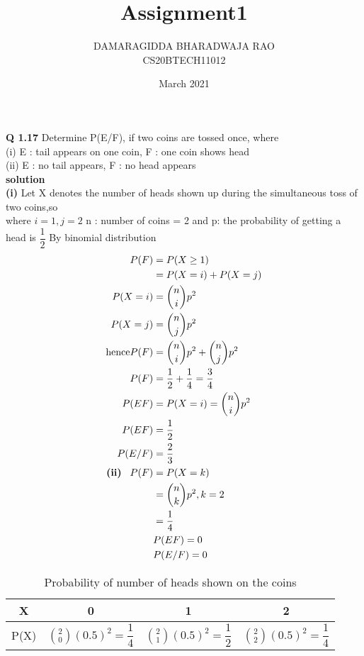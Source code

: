\documentclass[11pt,a4paper,twocolumn]{article}
\title{Assignment1}
\author{DAMARAGIDDA BHARADWAJA RAO\\CS20BTECH11012}
\date{March 2021}
\begin{document}
\maketitle
\noindent
\textbf{Q 1.17} Determine P(E/F), if two coins are tossed
once, where\\
(i) E : tail appears on one coin, F : one coin
shows head\\
\vspace{0.5cm}
(ii) E : no tail appears, F : no head appears\\
\textbf{solution}\\

\textbf{(i)} Let X denotes the number of heads shown up during the simultaneous toss of two coins,so \\
where $ i = 1,j = 2 $  n : number of coins = 2 and p: the probability of getting a head is $\dfrac{1}{2}$
By binomial distribution
\begin{align*}
P(F)&=P(X\geq 1)\\
&=P(X=i)+P(X=j)\\
P(X=i)&=\binom{n}{i} p ^2\\
P(X=j)&=\binom{n}{j} p ^2\\
\text{hence} P(F) &= \binom{n}{i} p ^2 + \binom{n}{j} p ^2\\
P(F) &= \frac{1}{2} + \frac{1}{4} = \frac{3}{4}\\
P(EF) &= P(X=i)=\binom{n}{i} p ^2\\
P(EF) &= \frac{1}{2}\\
P(E/F) &= \frac{2}{3}\\
\textbf{(ii)}\hspace{0.3cm}P(F) &=P(X=k)\\
&= \binom{n}{k} p^2, k = 2\\
& = \frac{1}{4}\\
&P(EF) = 0\\
&P(E/F) = 0
\end{align*}
\begin{table}[H]
\renewcommand{\arraystretch}{2}
\begin{tabular}{|c|c|c|c|}
\hline
     X&0&1&2  \\
     \hline
     P(X)&$\binom{2}{0}(0.5)^2=\dfrac{1}{4}$&$\binom{2}{1}(0.5)^2 = \dfrac{1}{2}$&$\binom{2}{2}(0.5)^2 = \dfrac{1}{4}$\\
     \hline
\end{tabular}\\
\caption{Probability of number of heads shown on the coins }
\label{table:1}
\end{table}
\end{document}
